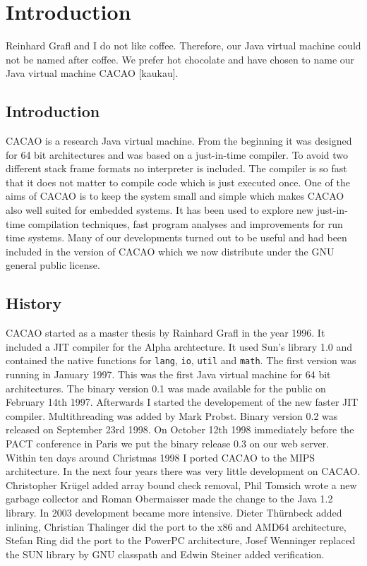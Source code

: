 \chapter{Introduction}

Reinhard Grafl and I do not like coffee. Therefore, our Java virtual machine
could not be named after coffee. We prefer hot chocolate and have chosen to
name our Java virtual machine CACAO [kaukau].

\section{Introduction}

CACAO is a research Java virtual machine. From the beginning it was designed
for 64 bit architectures and was based on a just-in-time compiler. To avoid
two different stack frame formats no interpreter is included. The compiler is
so fast that it does not matter to compile code which is just executed once.
One of the aims of CACAO is to keep the system small and simple which makes
CACAO also well suited for embedded systems. It has been used to explore new
just-in-time compilation techniques, fast program analyses and improvements
for run time systems. Many of our developments turned out to be useful and
had been included in the version of CACAO which we now distribute under the
GNU general public license.

\section{History}

CACAO started as a master thesis by Rainhard Grafl in the year 1996. It
included a JIT compiler
for the Alpha archtecture. It used Sun's library 1.0
and contained the native functions for {\tt lang}, {\tt io}, {\tt util} and
{\tt math}. The first version was running in January 1997. This was the first
Java virtual machine for 64 bit architectures. The binary version 0.1 was made
available for the public on February 14th 1997. Afterwards I started the
developement of the new faster JIT compiler. Multithreading was added by
Mark Probst. Binary version 0.2 was released on September 23rd 1998. On
October 12th 1998 immediately before the PACT conference in Paris we put the
binary release 0.3 on our web server. Within ten days around Christmas 1998
I ported CACAO to the MIPS architecture. In the next four years there was
very little development on CACAO. Christopher Kr\"ugel added array bound check
removal, Phil Tomsich wrote a new garbage collector and Roman Obermaisser
made the change to the Java 1.2 library. In 2003 development became more
intensive. Dieter Th\"urnbeck added inlining, Christian Thalinger did the
port to the x86 and AMD64 architecture, Stefan Ring did the port to the
PowerPC architecture, Josef Wenninger replaced the SUN library by GNU
classpath and Edwin Steiner added verification.

